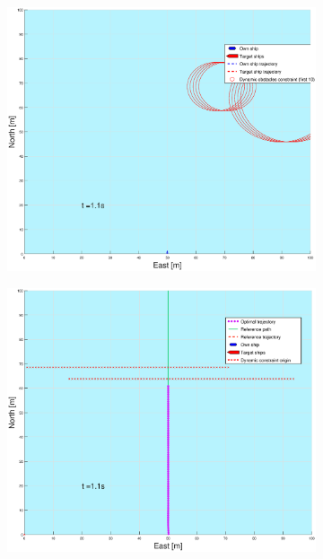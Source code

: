 \begin{figure}[ht!] %
    \begin{subfigure}[b]{0.49\textwidth}
        \centering
        \includegraphics[width=\textwidth]{Images/Figures/enkel_GW/_Simple_0fig1_time=1}
    \end{subfigure}
    \hfill
    \begin{subfigure}[b]{0.499\textwidth}
        \centering
        \includegraphics[width=\textwidth]{Images/Figures/enkel_GW/_Simple_0fig999_time=1}

\end{subfigure}
\end{figure}
